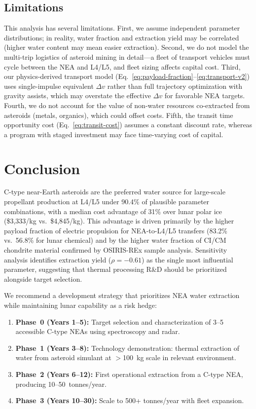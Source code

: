 \documentclass[preprint,12pt]{elsarticle}
\begin{document}
\subsection{Limitations}

This analysis has several limitations. First, we assume independent parameter distributions; in reality, water fraction and extraction yield may be correlated (higher water content may mean easier extraction). Second, we do not model the multi-trip logistics of asteroid mining in detail---a fleet of transport vehicles must cycle between the NEA and L4/L5, and fleet sizing affects capital cost. Third, our physics-derived transport model (Eq.~\ref{eq:payload-fraction}--\ref{eq:transport-v2}) uses single-impulse equivalent $\Delta v$ rather than full trajectory optimization with gravity assists, which may overstate the effective $\Delta v$ for favorable NEA targets. Fourth, we do not account for the value of non-water resources co-extracted from asteroids (metals, organics), which could offset costs. Fifth, the transit time opportunity cost (Eq.~\ref{eq:transit-cost}) assumes a constant discount rate, whereas a program with staged investment may face time-varying cost of capital.

\section{Conclusion}
\label{sec:conclusion}

C-type near-Earth asteroids are the preferred water source for large-scale propellant production at L4/L5 under 90.4\% of plausible parameter combinations, with a median cost advantage of 31\% over lunar polar ice (\$3,333/kg vs.\ \$4,845/kg). This advantage is driven primarily by the higher payload fraction of electric propulsion for NEA-to-L4/L5 transfers (83.2\% vs.\ 56.8\% for lunar chemical) and by the higher water fraction of CI/CM chondrite material confirmed by OSIRIS-REx sample analysis. Sensitivity analysis identifies extraction yield ($\rho = -0.61$) as the single most influential parameter, suggesting that thermal processing R\&D should be prioritized alongside target selection.

We recommend a development strategy that prioritizes NEA water extraction while maintaining lunar capability as a risk hedge:
\begin{enumerate}
    \item \textbf{Phase~0 (Years 1--5):} Target selection and characterization of 3--5 accessible C-type NEAs using spectroscopy and radar.
    \item \textbf{Phase~1 (Years 3--8):} Technology demonstration: thermal extraction of water from asteroid simulant at $>$100~kg scale in relevant environment.
    \item \textbf{Phase~2 (Years 6--12):} First operational extraction from a C-type NEA, producing 10--50~tonnes/year.
    \item \textbf{Phase~3 (Years 10--30):} Scale to 500+ tonnes/year with fleet expansion.
\end{enumerate}
\end{document}
